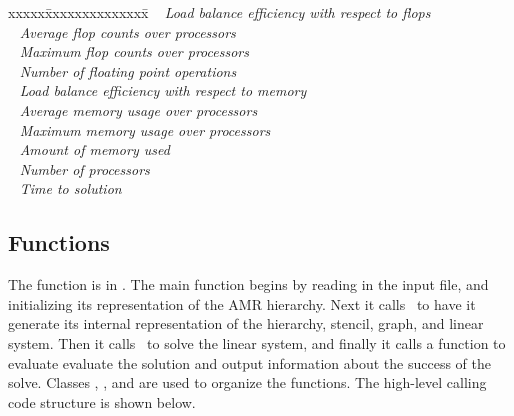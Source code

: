 \documentclass[10pt]{article}
\begin{document}
\begin{tabbing}
xxxxx\=xxxxxxxxxxxxxx\=\kill
\> \todo\  \>    \textit{Load balance efficiency with respect to flops}\\
\> \todo\  \> \textit{Average flop counts over processors} \\
\> \todo\  \> \textit{Maximum flop counts over processors} \\
\> \todo\  \> \textit{Number of floating point operations} \\
\> \todo\  \>    \textit{Load balance efficiency with respect to memory}\\
\> \todo\  \> \textit{Average memory usage over processors} \\
\> \todo\  \>    \textit{Maximum memory usage over processors} \\
\> \todo\  \> \textit{Amount of memory used} \\
\> \todo\  \> \textit{Number of processors} \\
\> \todo\  \>  \textit{Time to solution}
\end{tabbing}



\subsection{Functions} \label{ss:design}

The  function is in .  The main
function begins by reading in the input file, and initializing its
representation of the AMR hierarchy.  Next it calls \hypre\
to have it generate its internal representation of 
the hierarchy, stencil, graph, and linear system.  Then it
calls \hypre\ to solve the linear system, and finally it calls
a function to evaluate evaluate the solution and output 
information about the success of the solve.  Classes ,
\code{hierarchy}, and \code{hypre} are used to organize the functions.
The high-level  calling code structure is shown below.
\end{document}

